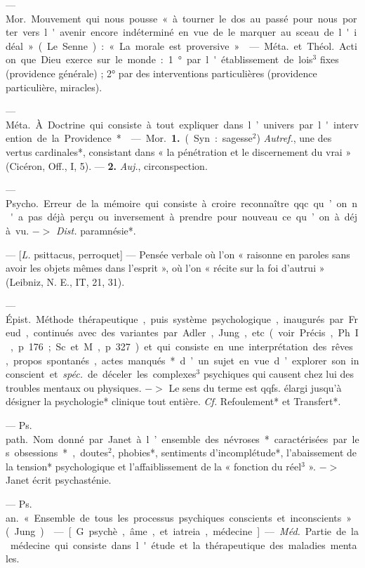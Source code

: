 \begin{itemize}[leftmargin=1cm, label=, itemsep=1pt]
 — \si{Mor.} Mouvement qui
nous pousse « à tourner le dos au
passé pour nous porter vers l'avenir
encore indéterminé en vue de le
marquer au sceau de l'idéal » (Le
Senne) : « La morale est proversive ».

 — \si{Méta.} et \si{Théol.} Action
que Dieu exerce sur le monde : 1° par
l'établissement de lois$^3$ fixes (providence générale) ; 2° par des interventions particulières (providence
particulière, miracles).

 — \si{Méta.} À. Doctrine qui consiste à tout expliquer
dans l’univers par l'intervention de
la Providence*.

 — \si{Mor.} {\bf 1.} (Syn. : sagesse$^2$)
{\it Autref.}, une des vertus cardinales*,
consistant dans « la pénétration et
le discernement du vrai » (Cicéron,
Off., I, 5). — {\bf 2.} {\it Auj.}, circonspection.

 — \si{Psycho.} Erreur de
la mémoire qui consiste à croire
reconnaître qqc. qu’on n'a pas déjà
perçu ou inversement à prendre
pour nouveau ce qu’on à déjà vu.
$->$ {\it Dist.} paramnésie*.

 — [{\it L.} psittacus, perroquet]
— Pensée verbale où l’on « raisonne
en paroles sans avoir les objets
mêmes dans l’esprit », où l’on « récite
sur la foi d'autrui » (Leibniz, N. E.,
IT, 21, 31).

 — \si{Épist.} Méthode thérapeutique, puis système psychologique, inaugurés par Freud, continués avec des variantes par Adler,
Jung, etc. (voir Précis, Ph. I, p. 176 ;
Sc. et M., p. 327) et qui consiste
en une interprétation des rêves,
propos spontanés, actes manqués*
d’un sujet en vue d’explorer son
inconscient et {\it spéc.} de déceler les
complexes$^3$ psychiques qui causent
chez lui des troubles mentaux ou
physiques. $->$ Le sens du terme
est qqfs. élargi jusqu’à désigner la
psychologie* clinique tout entière.
{\it Cf.} Refoulement* et Transfert*.

 — \si{Ps. path.} Nom
donné par Janet à l’ensemble des
névroses* caractérisées par les obsessions*, doutes$^2$, phobies*, sentiments
d’incomplétude*, l’abaissement de
la tension* psychologique et l’affaiblissement de la « fonction du réel$^3$ ».
$->$ Janet écrit psychasténie.

 — \si{Ps. an.} « Ensemble de tous
les processus psychiques conscients
et inconscients » (Jung).

 — [G. psychè, âme, et iatreia,
médecine] — \si{{\it Méd.}} Partie de la
médecine qui consiste dans l'étude
et la thérapeutique des maladies
mentales.


\end{itemize}
